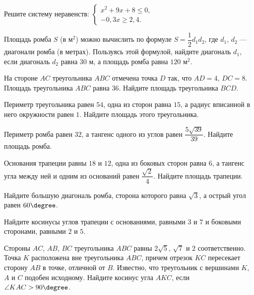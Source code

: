\begin{exam}
	\begin{listofex}[start=6]
		\item Решите систему неравенств:
		\( \left\{
		\begin{array}{l}
			x^2+9x+8\le0,\\
			-0,3x\ge2,4.
		\end{array}
		\right. \)
		\item Площадь ромба \( S \) (в м\( ^2 \)) можно вычислить по формуле \( S=\dfrac{1}{2}d_1d_2 \), где \( d_1 \), \( d_2 \) --- диагонали ромба (в метрах). Пользуясь этой формулой, найдите диагональ \( d_1 \), если диагональ \( d_2 \) равна \( 30 \) м, а площадь ромба равна \( 120 \) м\( ^2 \).
		\item На стороне \( AC \) треугольника \( ABC \) отмечена точка \( D \) так,
		что \( AD = 4 \), \( DC = 8 \).
		Площадь треугольника \( ABC \) равна \( 36 \).
		Найдите площадь треугольника \( BCD \).
		\item Периметр треугольника равен \( 54 \), одна из сторон равна \( 15 \),
		а радиус вписанной в него окружности равен \( 1 \).
		Найдите площадь этого треугольника.
		\item Периметр ромба равен \( 32 \), а тангенс одного из углов равен \( \dfrac{5\sqrt{39}}{39} \).
		Найдите площадь ромба.
		\item Основания трапеции равны \( 18 \) и \( 12 \),
		одна из боковых сторон равна \( 6 \),
		а тангенс угла между ней и одним из оснований равен \( \dfrac{\sqrt{2}}{4} \).
		Найдите площадь трапеции.
		
		\item Найдите большую диагональ ромба, сторона которого равна \( \sqrt{3} \), а острый угол равен \( 60\degree \).
		\item Найдите косинусы углов трапеции с основаниями,
		равными \( 3 \) и \( 7 \) и боковыми сторонами, равными \( 2 \) и \( 5 \).
		\item Стороны \( AC \), \( AB \), \( BC \) треугольника \( ABC \) равны \( 2\sqrt{5} \), \( \sqrt{7} \) и \( 2 \) соответственно. Точка \( K \) расположена вне треугольника \( ABC \), причем отрезок \( KC \) пересекает сторону \( AB \) в точке, отличной от \( B \). Известно, что треугольник с вершинами \( K \), \( A \) и \( C \) подобен исходному. Найдите косинус угла \( AKC \), если \( \angle KAC>90\degree \).
	\end{listofex}
\end{exam}